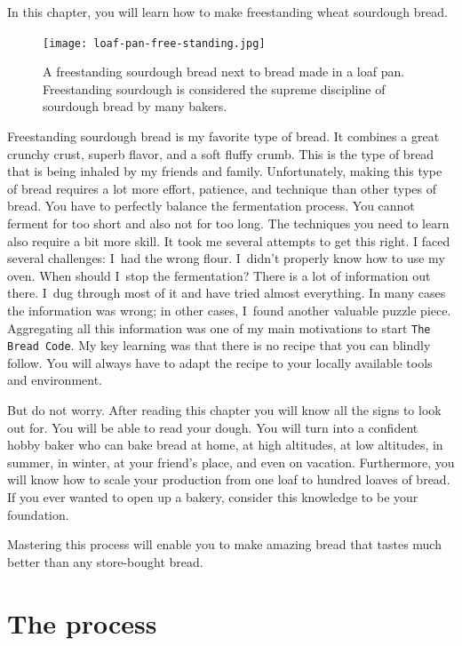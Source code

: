 \begin{quoting}
In this chapter, you will learn how to make
freestanding wheat sourdough bread.
\end{quoting}

\begin{figure}[!htb]
  \centering
  \texttt{[image: loaf-pan-free-standing.jpg]}
  \caption[Freestanding and loaf pan bread]{A freestanding sourdough bread
      next to bread made in a loaf pan.  Freestanding sourdough is considered
      the supreme discipline of sourdough bread by many bakers.}
\end{figure}

Freestanding sourdough bread is my favorite
type of bread. It combines a great crunchy crust, superb
flavor, and a soft fluffy crumb. This is the type of bread
that is being inhaled by my friends and family. Unfortunately,
making this type of bread requires a lot more effort, patience,
and technique than other types of bread. You have to perfectly
balance the fermentation process. You cannot ferment for too
short and also not for too long. The techniques you need to
learn also require a bit more skill. It took me several attempts
to get this right. I faced several challenges: I~had the wrong flour.
I~didn't properly know how to use my oven.
When should I~stop the fermentation? There is a lot of information
out there. I~dug through most of it and have tried almost everything.
In many cases the information was wrong; in other cases, I~found another
valuable puzzle piece. Aggregating all this
information was one of my main motivations to start \texttt{The Bread Code}.
My key learning was that there is no recipe that
you can blindly follow. You will always have to adapt the recipe
to your locally available tools and environment.

But do not worry. After reading this chapter you will know all the signs to
look out for. You will be able to read your dough.  You will turn into a
confident hobby baker who can bake bread at home, at high altitudes, at low
altitudes, in summer, in winter, at your friend's place, and even on vacation.
Furthermore, you will know how to scale your production from one loaf to
hundred loaves of bread.  If you ever wanted to open up a bakery, consider
this knowledge to be your foundation.

Mastering this process will enable you to make amazing bread
that tastes much better than any store-bought bread.

\section{The process}

